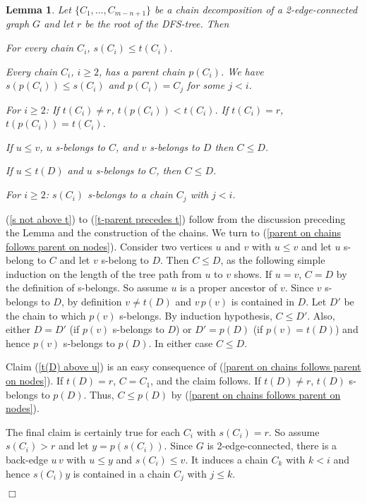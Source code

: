 \documentclass[paper=a4]{scrartcl}
\newtheorem{lemma}{Lemma}
\newcommand{\qed}{}
\newcommand{\mqed}{\hfill$\Box$}
\newlength{\proofpostskipamount}\newlength{\proofpreskipamount}
\newenvironment{proof}{\par\vspace{\proofpreskipamount}\noindent{\textbf{Proof:}}\hspace{0.5em}}{\nopagebreak \strut\nopagebreak \hspace{\fill}\mqed\par\vspace{\proofpostskipamount}\noindent}
\newcommand{\edge}[2]{\ensuremath{#1\,#2}}
\begin{document}
\begin{lemma}\label{facts about chain decomposition}
Let $\{C_1,\ldots,C_{m-n+1}\}$ be a chain decomposition of a 2-edge-connected graph $G$ and let $r$ be the root of the DFS-tree. Then
\begin{compactenum}[(1)]
\item \label{s not above t} For every chain $C_i$, $s(C_i) \le t(C_i)$.
\item \label{properties of parent chain} Every chain $C_i$, $i \ge 2$, has a parent chain $p(C_i)$. We have $s(p(C_i)) \le s(C_i)$ and $p(C_i) = C_j$ for some $j < i$.
\item \label{t-parent precedes t} For $i \ge 2$: If $t(C_i) \not= r$, $t(p(C_i)) < t(C_i)$. If $t(C_i) = r$, $t(p(C_i)) = t(C_i)$.
\item \label{parent on chains follows parent on nodes} If $u \le v$, $u$ s-belongs to $C$, and $v$ s-belongs to $D$ then $C \le D$.
\item \label{t(D) above u} If $u \le t(D)$ and $u$ s-belongs to $C$, then $C \le D$.
\item \label{s(C) s-belongs to earlier chain} For $i \ge 2$: $s(C_i)$ s-belongs to a chain $C_j$ with $j < i$.
\end{compactenum}
\end{lemma}
\begin{proof}
(\ref{s not above t}) to (\ref{t-parent precedes t}) follow from the discussion preceding the Lemma and the construction of the chains. We turn to (\ref{parent on chains follows parent on nodes}). Consider two vertices $u$ and $v$ with $u \le v$ and let $u$ s-belong to $C$ and let $v$ s-belong to $D$. Then $C \le D$, as the following simple induction on the length of the tree path from $u$ to $v$ shows. If $u = v$, $C=D$ by the definition of s-belongs. So assume $u$ is a proper ancestor of $v$. Since $v$ s-belongs to $D$, by definition $v \not= t(D)$ and $\edge{v}{p(v)}$ is contained in $D$. Let $D'$ be the chain to which $p(v)$ s-belongs. By induction hypothesis, $C \le D'$. Also, either $D = D'$ (if $p(v)$ s-belongs to $D$) or $D' = p(D)$ (if $p(v) = t(D)$) and hence $p(v)$ s-belongs to $p(D)$. In either case $C \le D$.

Claim (\ref{t(D) above u}) is an easy consequence of (\ref{parent on chains follows parent on nodes}). If $t(D) = r$, $C = C_1$, and the claim follows. If $t(D) \not= r$, $t(D)$ s-belongs to $p(D)$. Thus, $C \le p(D)$ by  (\ref{parent on chains follows parent on nodes}).

The final claim is certainly true for each $C_i$ with $s(C_i) = r$. So assume $s(C_i) > r$ and let $y = p(s(C_i))$. Since $G$ is 2-edge-connected, there is a back-edge $\edge uv$ with $u \le y$ and $s(C_i) \le v$. It induces a chain $C_k$ with $k < i$ and hence $s(C_i) y$ is contained in a chain $C_j$ with $j \le k$. \qed
\end{proof}
\end{document}
